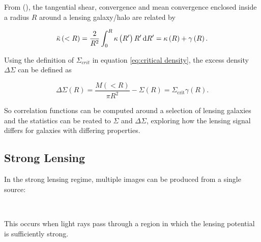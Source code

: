 \documentclass{beamer}
\begin{document}
  \begin{frame}
    From (\cite{agn}), the tangential shear, convergence and mean convergence enclosed inside a radius $R$ around a lensing galaxy/halo are related by

    \begin{equation} \label{eq:mean kappa}
      \bar{\kappa}\left( <R \right) = \frac{2}{R^2} \int_0^R \kappa \left( R' \right)R'\dif R' = \kappa \left( R \right) + \gamma \left( R \right).
    \end{equation}

    Using the definition of $\Sigma_{crit}$ in equation \ref{eq:critical density}, the excess density $\Delta\Sigma$ can be defined as

    \begin{equation} \label{eq:delta sigma}
      \Delta\Sigma\left( R \right) = \frac{M\left( <R \right)}{\pi R^2} - \Sigma\left( R \right) = \Sigma_{\text{crit}}\gamma\left( R \right).
    \end{equation}

    So correlation functions can be computed around a selection of lensing galaxies and the statistics can be reated to $\Sigma$ and $\Delta\Sigma$, exploring how the lensing signal differs for galaxies with differing properties.
  \end{frame}

  \subsection{Strong Lensing}

  \begin{frame}
    In the strong lensing regime, multiple images can be produced from a single source:
    \\
    \centering
    \\
    \raggedright
    This occurs when light rays pass through a region in which the lensing potential is sufficiently strong.
  \end{frame}
\end{document}
